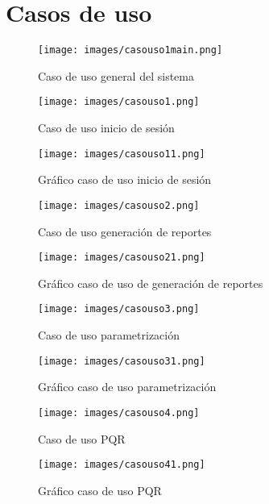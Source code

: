 \section{Casos de uso}
\begin{figure}[htbp]
	\centering
		\texttt{[image: images/casouso1main.png]}
	\caption{Caso de uso general del sistema}
	\label{fig:casouso1main1}
\end{figure}%
\newpage%
\begin{figure}[htbp]
	\centering
		\texttt{[image: images/casouso1.png]}
	\caption{Caso de uso inicio de sesi\'on}
	\label{fig:casouso11}
\end{figure}%
\begin{figure}[htbp]
	\centering
		\texttt{[image: images/casouso11.png]}
	\caption{Gr\'afico caso de uso inicio de sesi\'on}
	\label{fig:casouso1g1}
\end{figure}%
%
\newpage%
\begin{figure}[htbp]
	\centering
		\texttt{[image: images/casouso2.png]}
	\caption{Caso de uso generaci\'on de reportes}
	\label{fig:casouso21}
\end{figure}%
\begin{figure}[htbp]
	\centering
		\texttt{[image: images/casouso21.png]}
	\caption{Gr\'afico caso de uso de generaci\'on de reportes}
	\label{fig:casouso2g1}
\end{figure}%
%
\newpage%
\begin{figure}[htbp]
	\centering
		\texttt{[image: images/casouso3.png]}
	\caption{Caso de uso  parametrizaci\'on}
	\label{fig:casouso31}
\end{figure}%
\begin{figure}[htbp]
	\centering
		\texttt{[image: images/casouso31.png]}
	\caption{Gr\'afico caso de uso parametrizaci\'on}
	\label{fig:casouso3g1}
\end{figure}%
%
\newpage%
\begin{figure}[htbp]
	\centering
		\texttt{[image: images/casouso4.png]}
	\caption{Caso de uso PQR}
	\label{fig:casouso41}
\end{figure}%
\begin{figure}[htbp]
	\centering
		\texttt{[image: images/casouso41.png]}
	\caption{Gr\'afico caso de uso PQR}
	\label{fig:casouso4g1}
\end{figure}%
%